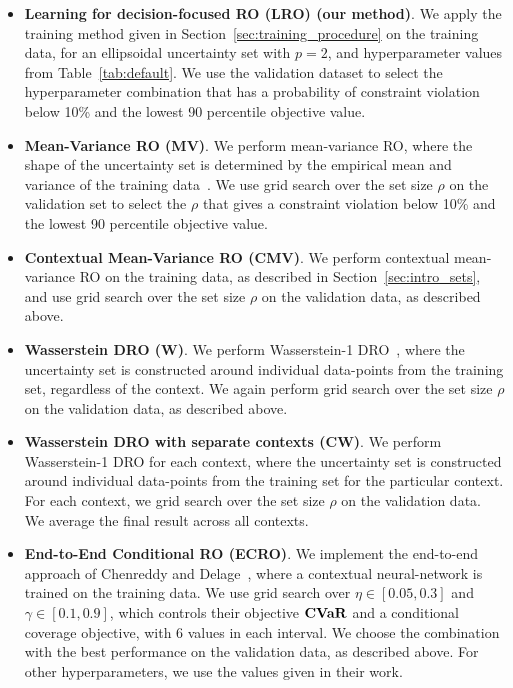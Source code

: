 \begin{itemize}
\item {\bf Learning for decision-focused \gls{RO} (LRO) (our method)}. We apply the training method given in Section~\ref{sec:training_procedure} on the training data, for an ellipsoidal uncertainty set with $p=2$, and hyperparameter values from Table~\ref{tab:default}. We use the validation dataset to select the hyperparameter combination that has a probability of constraint violation below 10\% and the lowest 90 percentile objective value.
\item {\bf Mean-Variance \gls{RO} (MV)}. We perform mean-variance \gls{RO}, where the shape of the uncertainty set is determined by the empirical mean and variance of the training data~\citep{ben-tal_robust_2000}. We use grid search over the set size $\rho$ on the validation set to select the $\rho$ that gives a constraint violation below 10\% and the lowest 90 percentile objective value.
\item{\bf Contextual Mean-Variance \gls{RO} (CMV)}. We perform contextual mean-variance \gls{RO} on the training data, as described in Section~\ref{sec:intro_sets}, and use grid search over the set size $\rho$ on the validation data, as described above.
\item {\bf Wasserstein \gls{DRO} (W)}. We perform Wasserstein-1 \gls{DRO}~\citep{mohajerin_esfahani_data-driven_2018}, where the uncertainty set is constructed around individual data-points from the training set, regardless of the context. We again perform grid search over the set size $\rho$ on the validation data, as described above.
\item {\bf Wasserstein \gls{DRO} with separate contexts (CW)}. We perform Wasserstein-1 \gls{DRO} for each context, where the uncertainty set is constructed around individual data-points from the training set for the particular context. For each context, we grid search over the set size $\rho$ on the validation data. We average the final result across all contexts. 
\item {\bf End-to-End Conditional \gls{RO} (ECRO)}. We implement the end-to-end approach of Chenreddy and Delage~\cite{cond-cov}, where a contextual neural-network is trained on the training data. We use grid search over $\eta \in [0.05,0.3]$ and $\gamma \in [0.1,0.9]$, which controls their objective $\mathop{\bf CVaR}$ and a conditional coverage objective, with 6 values in each interval. We choose the combination with the best performance on the validation data, as described above. For other hyperparameters, we use the values given in their work. 

\end{itemize}
